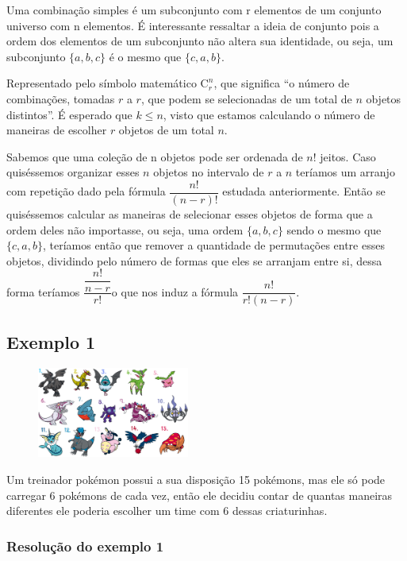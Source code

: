 Uma combinação simples é um subconjunto com r elementos de um conjunto universo com n elementos. É interessante ressaltar a ideia de conjunto pois a ordem dos elementos de um subconjunto não altera sua identidade, ou seja, um subconjunto $\{a, b, c\}$ é o mesmo que $\{c , a, b\}$.

Representado pelo símbolo matemático $\mathrm{C}_r^n$, que significa ``o número de combinações, tomadas $r$ a $r$, que podem se selecionadas de um total de $n$ objetos distintos''.  É esperado que $k \leq n$, visto que estamos calculando o número de maneiras de escolher $r$ objetos de um total $n$.

Sabemos que uma coleção de n objetos pode ser ordenada de $n!$ jeitos. Caso quiséssemos organizar esses $n$ objetos no intervalo de $r$ a $n$ teríamos um arranjo com repetição dado pela fórmula $ \dfrac{n!}{(n - r)!}$ estudada anteriormente. Então se quiséssemos calcular as maneiras de selecionar esses objetos de forma que a ordem deles não importasse, ou seja, uma ordem $\{a, b, c\}$ sendo o mesmo que $\{c , a, b\}$, teríamos então que remover a quantidade de permutações entre esses objetos, dividindo pelo número de formas que eles se arranjam entre si, dessa forma teríamos $\dfrac{\dfrac{n!}{n-r}}{r!}$o que nos induz a fórmula $\dfrac{n!}{r!(n-r)}$.

\subsection*{Exemplo 1}

\begin{figure}
	\includegraphics[width=5cm, left]{imagens/pokemon.png}
\end{figure}

Um treinador pokémon possui a sua disposição 15 pokémons, mas ele só pode carregar 6 pokémons de cada vez, então ele decidiu contar de quantas maneiras diferentes ele poderia escolher um time com 6 dessas criaturinhas.

\subsubsection*{Resolução do exemplo 1}


